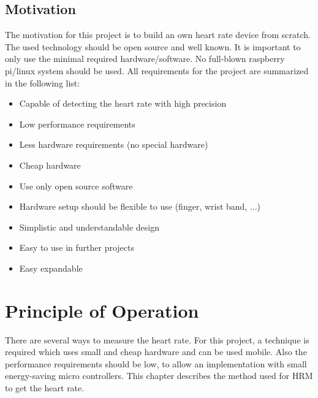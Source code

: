 \documentclass[notitlepage]{scrreprt}
\begin{document}
\section{Motivation}
The motivation for this project is to build an own heart rate device from scratch. The used technology should be open source and well known. It is important to only use the minimal required hardware/software. No full-blown raspberry pi/linux system should be used. All requirements for the project are summarized in the following list:

\begin{itemize}
	\item{Capable of detecting the heart rate with high precision}
	\item{Low performance requirements}
	\item{Less hardware requirements (no special hardware)}
	\item{Cheap hardware}
	\item{Use only open source software}
	\item{Hardware setup should be flexible to use (finger, wrist band, ...)}
	\item{Simplistic and understandable design}
	\item{Easy to use in further projects}
	\item{Easy expandable}
\end{itemize}

\chapter{Principle of Operation}
\label{chap:principle-of-operation}

There are several ways to measure the heart rate. For this project, a technique is required which uses small and cheap hardware and can be used mobile. Also the performance requirements should be low, to allow an implementation with small energy-saving micro controllers. This chapter describes the method used for HRM to get the heart rate.
\end{document}
